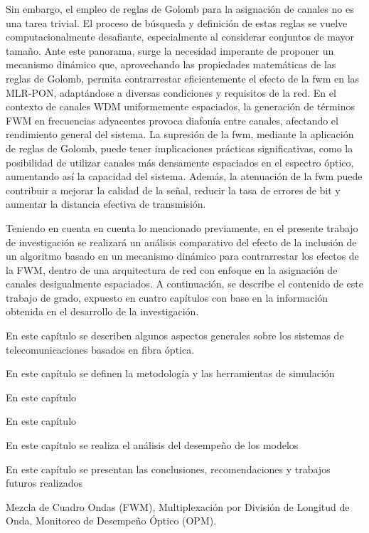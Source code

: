 Sin embargo, el empleo de reglas de Golomb para la asignación de canales no es una tarea trivial. El proceso de búsqueda y definición de estas reglas se vuelve computacionalmente desafiante, especialmente al considerar conjuntos de mayor tamaño.
Ante este panorama, surge la necesidad imperante de proponer un mecanismo dinámico que, aprovechando las propiedades matemáticas de las reglas de Golomb, permita contrarrestar eficientemente el efecto de la \acrshort{fwm} en las \acrfull{MLR-PON}, adaptándose a diversas condiciones y requisitos de la red. En el contexto de canales WDM uniformemente espaciados, la generación de términos \acrshort{FWM} en frecuencias adyacentes provoca diafonía entre canales, afectando el rendimiento general del sistema. La supresión de la \acrshort{fwm}, mediante la aplicación de reglas de Golomb, puede tener implicaciones prácticas significativas, como la posibilidad de utilizar canales más densamente espaciados en el espectro óptico, aumentando así la capacidad del sistema. Además, la atenuación de la \acrshort{fwm} puede contribuir a mejorar la calidad de la señal, reducir la tasa de errores de bit y aumentar la distancia efectiva de transmisión.


Teniendo en cuenta en cuenta lo mencionado previamente, en el presente trabajo de investigación se realizará un análisis comparativo del efecto de la inclusión de un algoritmo basado en un mecanismo dinámico para contrarrestar los efectos de la \gls{FWM}, dentro de una arquitectura de red con enfoque en la asignación de canales desigualmente espaciados.  A continuación, se describe el contenido de este trabajo de grado, expuesto en cuatro capítulos con base en la información obtenida en el desarrollo de la investigación. 
\vfill



En este capítulo se describen algunos aspectos generales sobre los sistemas de telecomunicaciones basados en fibra óptica. 
\vfill


En este capítulo se definen la metodología y las herramientas de simulación 
\vfill


En este capítulo
\vfill


En este capítulo %
\vfill


En este capítulo se realiza el análisis del desempeño de los modelos 
\vfill


En este capítulo se presentan las conclusiones, recomendaciones y trabajos futuros realizados 
\vfill



Mezcla de Cuadro Ondas (FWM), Multiplexación por División de Longitud de Onda, Monitoreo de Desempeño Óptico (OPM).
